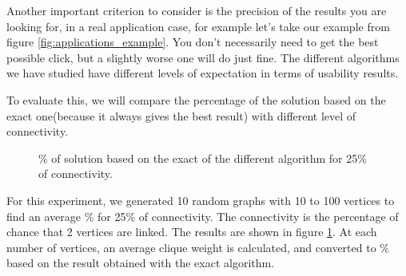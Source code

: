 Another important criterion to consider is the precision of the results you are looking for, in a real application case, for example let's take our example from figure \ref{fig:applications_example}. You don't necessarily need to get the best possible click, but a slightly worse one will do just fine. The different algorithms we have studied have different levels of expectation in terms of usability results. \bigskip

To evaluate this, we will compare the percentage of the solution based on the exact one(because it always gives the best result) with different level of connectivity. \bigskip

\begin{figure}[H]
    \centering
    \caption{\% of solution based on the exact of the different algorithm for 25\% of connectivity.}
    \label{fig:algorithm_25_accuracy}
\end{figure}


For this experiment, we generated 10 random graphs with 10 to 100 vertices to find an average \% for 25\% of connectivity. The connectivity is the percentage of chance that 2 vertices are linked. The results are shown in figure \ref{fig:algorithm_25_accuracy}. At each number of vertices, an average clique weight is calculated, and converted to \% based on the result obtained with the exact algorithm. \bigskip

